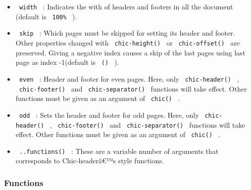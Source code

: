 \begin{itemize}
\tightlist
\item
  \texttt{\ width\ } : Indicates the with of headers and footers in all
  the document (default is \texttt{\ 100\%\ } ).
\item
  \texttt{\ skip\ } : Which pages must be skipped for setting its header
  and footer. Other properties changed with \texttt{\ chic-height()\ }
  or \texttt{\ chic-offset()\ } are preserved. Giving a negative index
  causes a skip of the last pages using last page as index -1(default is
  \texttt{\ ()\ } ).
\item
  \texttt{\ even\ } : Header and footer for even pages. Here, only
  \texttt{\ chic-header()\ } , \texttt{\ chic-footer()\ } and
  \texttt{\ chic-separator()\ } functions will take effect. Other
  functions must be given as an argument of \texttt{\ chic()\ } .
\item
  \texttt{\ odd\ } : Sets the header and footer for odd pages. Here,
  only \texttt{\ chic-header()\ } , \texttt{\ chic-footer()\ } and
  \texttt{\ chic-separator()\ } functions will take effect. Other
  functions must be given as an argument of \texttt{\ chic()\ } .
\item
  \texttt{\ ..functions()\ } : These are a variable number of arguments
  that corresponds to Chic-headerâ€™s style functions.
\end{itemize}

\subsubsection{Functions}\label{functions}

